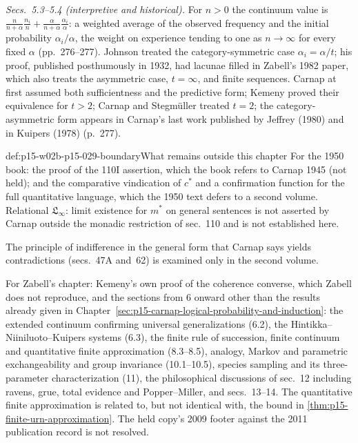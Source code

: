 \emph{Secs.~5.3--5.4 (interpretive and historical).} For \(n>0\) the
continuum value is
\(\frac n{n+\alpha}\frac{n_i}n+\frac\alpha{n+\alpha}\frac{\alpha_i}\alpha\):
a weighted average of the observed frequency and the initial
probability \(\alpha_i/\alpha\), the weight on experience tending to one
as \(n\to\infty\) for every fixed \(\alpha\) (pp.~276--277). Johnson
treated the category-symmetric case \(\alpha_i=\alpha/t\); his proof,
published posthumously in 1932, had lacunae filled in Zabell's 1982
paper, which also treats the asymmetric case, \(t=\infty\), and finite
sequences. Carnap at first assumed both sufficientness and the
predictive form; Kemeny proved their equivalence for \(t>2\); Carnap
and Stegmüller treated \(t=2\); the category-asymmetric form appears
in Carnap's last work published by Jeffrey (1980) and in Kuipers (1978)
(p.~277).

\begin{proofboundary}{def:p15-w02b-p15-029-boundary}{What remains outside this chapter}
For the 1950 book: the proof of the 110I assertion, which the book refers to Carnap 1945 (not held); and the
comparative vindication of \(c^*\) and a confirmation function for the
full quantitative language, which the 1950 text defers to a second
volume. Relational \(\mathfrak L_\infty\): limit existence for \(m^*\)
on general sentences is not asserted by Carnap outside the monadic
restriction of sec.~110 and is not established here.

The principle of indifference in the general form that Carnap says
yields contradictions (secs.~47A and~62) is examined only in the second
volume.

For Zabell's chapter: Kemeny's own proof of the coherence converse,
which Zabell does not reproduce, and the sections from 6 onward
other than the results already given in
Chapter~\ref{sec:p15-carnap-logical-probability-and-induction}: the
extended continuum confirming universal generalizations (6.2), the
Hintikka--Niiniluoto--Kuipers systems (6.3), the finite rule of
succession, finite continuum and quantitative finite approximation
(8.3--8.5), analogy, Markov and parametric exchangeability and group
invariance (10.1--10.5), species sampling and its three-parameter
characterization (11), the philosophical discussions of sec.~12
including ravens, grue, total evidence and Popper--Miller, and
secs.~13--14. The quantitative finite approximation is related to, but
not identical with, the bound in \cref{thm:p15-finite-urn-approximation}.
The held copy's 2009 footer against the 2011 publication record is not
resolved.
\end{proofboundary}
